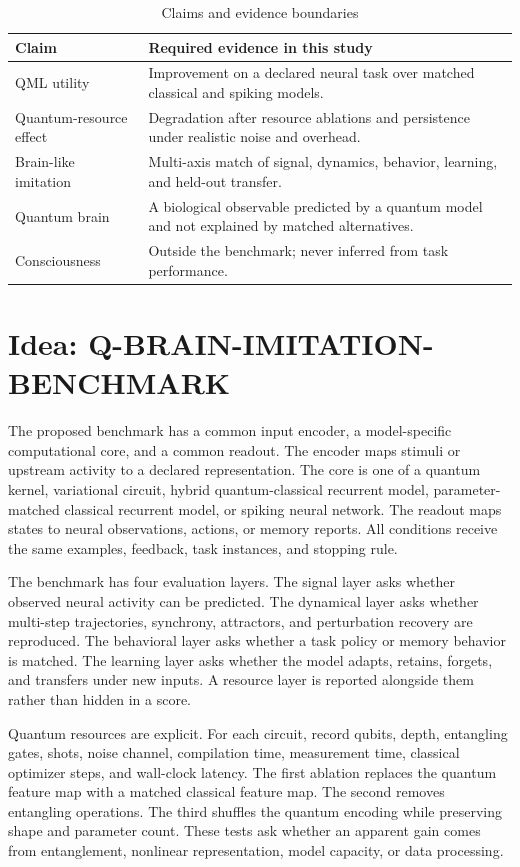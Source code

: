 \documentclass[conference]{IEEEtran}
\begin{document}
\begin{table}[t]
\caption{Claims and evidence boundaries}
\label{tab:claims}
\centering
\footnotesize
\begin{tabular}{p{}p{}}
\hline
Claim & Required evidence in this study \\
\hline
QML utility & Improvement on a declared neural task over matched classical and spiking models. \\
Quantum-resource effect & Degradation after resource ablations and persistence under realistic noise and overhead. \\
Brain-like imitation & Multi-axis match of signal, dynamics, behavior, learning, and held-out transfer. \\
Quantum brain & A biological observable predicted by a quantum model and not explained by matched alternatives. \\
Consciousness & Outside the benchmark; never inferred from task performance. \\
\hline
\end{tabular}
\end{table}

\section{Idea: Q-BRAIN-IMITATION-BENCHMARK}
\label{sec:idea}

The proposed benchmark has a common input encoder, a model-specific computational core,
and a common readout. The encoder maps stimuli or upstream activity to a declared
representation. The core is one of a quantum kernel, variational circuit, hybrid
quantum-classical recurrent model, parameter-matched classical recurrent model, or
spiking neural network. The readout maps states to neural observations, actions, or
memory reports. All conditions receive the same examples, feedback, task instances,
and stopping rule.

The benchmark has four evaluation layers. The signal layer asks whether observed neural
activity can be predicted. The dynamical layer asks whether multi-step trajectories,
synchrony, attractors, and perturbation recovery are reproduced. The behavioral layer
asks whether a task policy or memory behavior is matched. The learning layer asks whether
the model adapts, retains, forgets, and transfers under new inputs. A resource layer is
reported alongside them rather than hidden in a score.

Quantum resources are explicit. For each circuit, record qubits, depth, entangling gates,
shots, noise channel, compilation time, measurement time, classical optimizer steps,
and wall-clock latency. The first ablation replaces the quantum feature map with a
matched classical feature map. The second removes entangling operations. The third
shuffles the quantum encoding while preserving shape and parameter count. These tests
ask whether an apparent gain comes from entanglement, nonlinear representation, model
capacity, or data processing.
\end{document}
